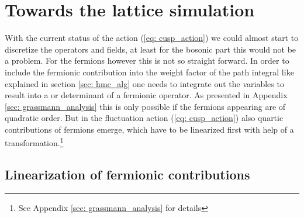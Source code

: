 \chapter{Towards the lattice simulation}
\label{sec: towards_lat}
With the current status of the action (\ref{eq: cusp_action}) we could almost start to discretize the operators and fields, at least for the bosonic part this would not be a problem. For the fermions however this is not so straight forward. In order to include the fermionic contribution into the weight factor of the path integral like explained in section \ref{sec: hmc_alg} one needs to integrate out the  variables to result into a  or determinant of a fermionic operator. As presented in Appendix \ref{sec: grassmann_analysis} this is only possible if the fermions appearing are of quadratic order. But in the fluctuation action (\ref{eq: cusp_action}) also quartic contributions of fermions emerge, which have to be linearized first with help of a  transformation.\footnote{See Appendix \ref{sec: grassmann_analysis} for details}
%
%
%
%
%
%
\section{Linearization of fermionic contributions}
